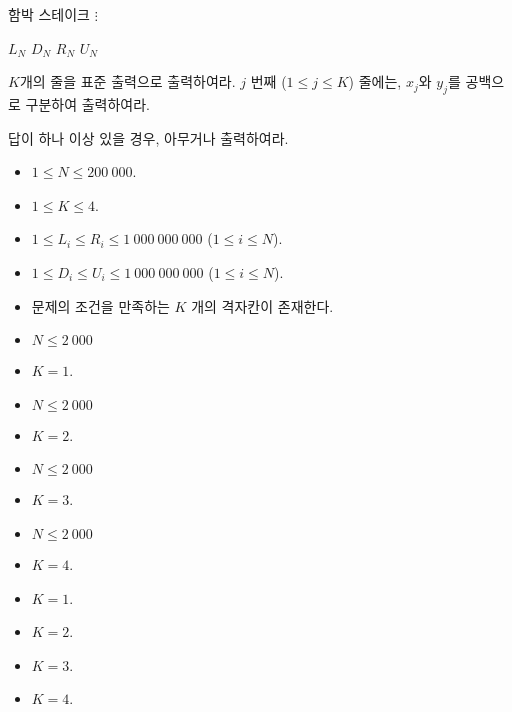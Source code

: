 \begin{problem}{함박 스테이크}
$\vdots$

$L_N$ $D_N$ $R_N$ $U_N$

\OutputFile

$K$개의 줄을 표준 출력으로 출력하여라. $j$ 번째 ($1 \le j \le K$) 줄에는, $x_j$와 $y_j$를 공백으로 구분하여 출력하여라.

답이 하나 이상 있을 경우, 아무거나 출력하여라.

\Constraints

\begin{itemize}
	\item $1 \le N \le 200\ 000$.
	\item $1 \le K \le 4$.
	\item $1 \le L_i \le R_i \le 1\ 000\ 000\ 000$ ($1 \le i \le N$).
	\item $1 \le D_i \le U_i \le 1\ 000\ 000\ 000$ ($1 \le i \le N$).
	\item 문제의 조건을 만족하는 $K$ 개의 격자칸이 존재한다.
\end{itemize}


\begin{itemize}
	\item $N \le 2\ 000$
	\item $K=1$.
\end{itemize}
\begin{itemize}
	\item $N \le 2\ 000$
	\item $K=2$.
\end{itemize}
\begin{itemize}
	\item $N \le 2\ 000$
	\item $K=3$.
\end{itemize}
\begin{itemize}
	\item $N \le 2\ 000$
	\item $K=4$.
\end{itemize}
\begin{itemize}
	\item $K=1$.
\end{itemize}
\begin{itemize}
	\item $K=2$.
\end{itemize}
\begin{itemize}
	\item $K=3$.
\end{itemize}
\begin{itemize}
	\item $K=4$.
\end{itemize}


\end{problem}
